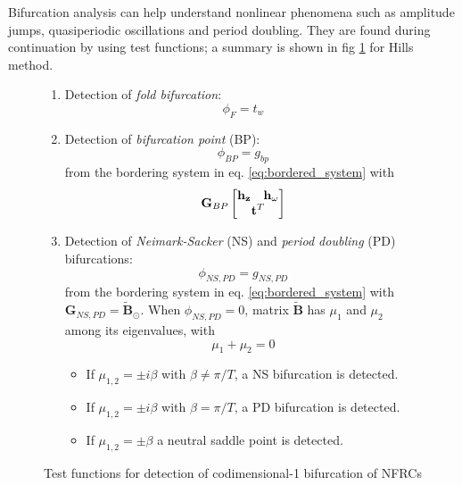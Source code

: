 Bifurcation analysis can help understand nonlinear phenomena such as amplitude
jumps, quasiperiodic oscillations and period doubling. They are found during
continuation by using test functions; a summary is shown in fig
\ref{fig:bif_scheme} for Hills method.

\begin{figure}[ht!]
  \centering
 \begin{mdframed}
    \begin{enumerate}
    \item Detection of \textit{fold bifurcation}:\\
      \begin{equation*}
        \phi_F = t_{w}
      \end{equation*}
    \item Detection of \textit{bifurcation point} (BP):\\
      \begin{equation*}
        \phi_{BP} = g_{bp}
      \end{equation*}
      from the bordering system in eq. \ref{eq:bordered_system} with
      \begin{equation*}
        \bm G_{BP}
        \begin{bmatrix}
          \bm h_{\bm z} & \bm h_{\omega} \\
          \multicolumn{2}{c}{\bm t^T}
        \end{bmatrix}
      \end{equation*}
    \item Detection of \textit{Neimark-Sacker} (NS) and \textit{period doubling}
      (PD) bifurcations:\\
      \begin{equation*}
        \phi_{NS,PD} = g_{NS,PD}
      \end{equation*}
      from the bordering system in eq. \ref{eq:bordered_system} with $\bm
      G_{NS,PD} = \tilde{\bm B}_\odot$. When $\phi_{NS,PD} = 0$, matrix
      $\tilde{\bm B}$ has $\mu_1$ and $\mu_2$ among its eigenvalues, with
      \begin{equation*}
        \mu_1 + \mu_2 = 0
      \end{equation*}
      \begin{itemize}
      \item If $\mu_{1,2}=\pm i\beta$ with $\beta \neq \pi/T$, a NS
        bifurcation is detected.
      \item If $\mu_{1,2}=\pm i\beta$ with $\beta = \pi/T$, a PD bifurcation is
        detected.
      \item If $\mu_{1,2}=\pm \beta$ a neutral saddle point is detected.
      \end{itemize}
    \end{enumerate}
    \end{mdframed}
    \caption{Test functions for detection of codimensional-1 bifurcation of NFRCs}
    \label{fig:bif_scheme}
\end{figure}

